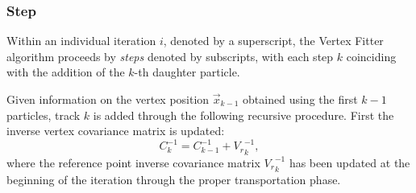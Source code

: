 %
%
%

\subsubsection{Step}
Within an individual iteration $i$, denoted by a superscript, the Vertex Fitter algorithm proceeds by \textit{steps} denoted by subscripts, with each step $k$ coinciding with the addition of the $k$-th daughter particle.

Given information on the vertex position $\vec{x}_{k-1}$ obtained using the first $k-1$ particles, track $k$ is added through the following recursive procedure.
First the inverse vertex covariance matrix is updated:
\begin{equation}
C_k^{-1} = C_{k-1}^{-1} + {V_r}_k^{-1},
\label{eq:3:VF_new_inv_covmatrix}
\end{equation}
where the reference point inverse covariance matrix ${V_r}_k^{-1}$ has been updated at the beginning of the iteration through the proper transportation phase.


